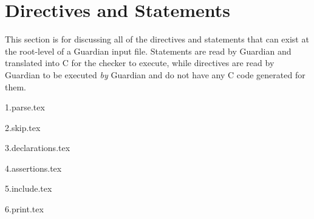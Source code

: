 
\section{Directives and Statements}
{
	This section is for discussing all of the directives and statements that can
	exist at the root-level of a Guardian input file.
	Statements are read by Guardian and translated into C for the checker to
	execute, while directives are read by Guardian to be executed \textit{by}
	Guardian and do not have any C code generated for them.
	
	{1.parse.tex}
	
	{2.skip.tex}
	
	{3.declarations.tex}
	
	{4.assertions.tex}
	
	{5.include.tex}
	
	{6.print.tex}
}

